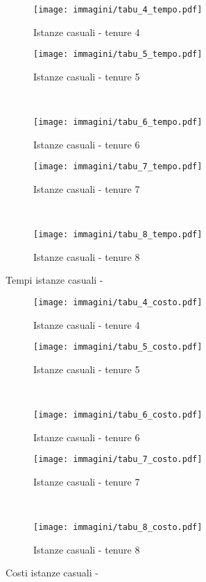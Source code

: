 \begin{figure}[htb]
	\centering
	\begin{subfigure}[b]{.45\textwidth}
		\texttt{[image: immagini/tabu\_4\_tempo.pdf]}
		\caption{Istanze casuali - tenure 4}
	\end{subfigure}
	\quad
	\begin{subfigure}[b]{.45\textwidth}
		\texttt{[image: immagini/tabu\_5\_tempo.pdf]}
		\caption{Istanze casuali - tenure 5}
	\end{subfigure}
	\\
	\begin{subfigure}[b]{.45\textwidth}
		\texttt{[image: immagini/tabu\_6\_tempo.pdf]}
		\caption{Istanze casuali - tenure 6}
	\end{subfigure}
	\quad
	\begin{subfigure}[b]{.45\textwidth}
		\texttt{[image: immagini/tabu\_7\_tempo.pdf]}
		\caption{Istanze casuali - tenure 7}
	\end{subfigure}
	\\
	\begin{subfigure}[b]{.45\textwidth}
		\texttt{[image: immagini/tabu\_8\_tempo.pdf]}
		\caption{Istanze casuali - tenure 8}
	\end{subfigure}
	\caption{Tempi istanze casuali - \tabu}
	\label{fig:tempi tabu}
\end{figure}

\begin{figure}[htb]
	\centering
	\begin{subfigure}[b]{.45\textwidth}
		\texttt{[image: immagini/tabu\_4\_costo.pdf]}
		\caption{Istanze casuali - tenure 4}
	\end{subfigure}
	\quad
	\begin{subfigure}[b]{.45\textwidth}
		\texttt{[image: immagini/tabu\_5\_costo.pdf]}
		\caption{Istanze casuali - tenure 5}
	\end{subfigure}
	\\
	\begin{subfigure}[b]{.45\textwidth}
		\texttt{[image: immagini/tabu\_6\_costo.pdf]}
		\caption{Istanze casuali - tenure 6}
	\end{subfigure}
	\quad
	\begin{subfigure}[b]{.45\textwidth}
		\texttt{[image: immagini/tabu\_7\_costo.pdf]}
		\caption{Istanze casuali - tenure 7}
	\end{subfigure}
	\\
	\begin{subfigure}[b]{.45\textwidth}
		\texttt{[image: immagini/tabu\_8\_costo.pdf]}
		\caption{Istanze casuali - tenure 8}
	\end{subfigure}
	\caption{Costi istanze casuali - \tabu}
	\label{fig:costi tabu}
\end{figure}

